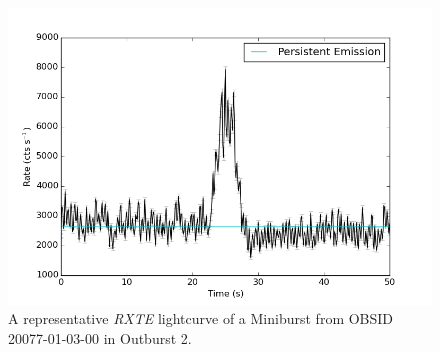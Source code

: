 \begin{figure}
  \centering
  \includegraphics[width=.9\linewidth, trim={0cm 0 0cm 0},clip]{images/mini.png}
  \caption{\small  A representative \textit{RXTE} lightcurve of a Miniburst from OBSID 20077-01-03-00 in Outburst 2.}
  \label{fig:a_mini}
\end{figure}
